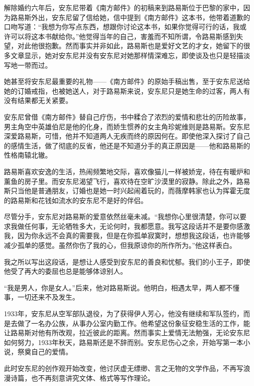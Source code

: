 解除婚约六年后，安东尼带着《南方邮件》的初稿来到路易斯位于巴黎的家中，因为路易斯外出，安东尼留了信给她，信中提到《南方邮件》这本书，他带着道歉的口吻写道：“我想为你写点东西，想跟你讨论这本书，如果你觉得可行的话，我或许可以将这本书献给你。”他觉得当年的自己，害羞而不知所谓，令路易斯感到失望，对此他很抱歉。然而事实并非如此，路易斯也是爱好文艺的才女，她留下的很多文章显示，她对安东尼并没有安东尼对她那样情深难忘，即使谈及也只是轻描淡写地一带而过。

她甚至将安东尼最重要的礼物------《南方邮件》的原始手稿出售，至于安东尼送给她的订婚戒指，也被她送人，对于路易斯来说，安东尼只是她生命的过客，两人有没有结果都无关紧要。

安东尼曾借《南方邮件》替自己疗伤，书中糅合了浓烈的爱情和悲壮的历险故事，男主角空中英雄伯尼是他的化身，而娇生惯养的女主角珍妮维则是路易斯。安东尼深爱路易斯，可惜，他并不知道两人无疾而终的原因何在。即使他深入探讨了自己的感情生活，做了彻底的反省，他还是不知道分手的真正原因是------他和路易斯的性格南辕北辙。

路易斯喜欢安逸的生活，热闹频繁地交际，喜欢像猫儿一样被娇宠，待在有暖炉和薰鱼的房子里。而安东尼渴望飞行，喜欢待在空旷沙漠里的寂静。除此之外，路易斯只当他是普通朋友，订婚也是她一时兴起闹着玩的，而薇摩韩家也认为挥霍无度的路易斯和花钱如流水的安东尼不是好的伴侣。

尽管分手，安东尼对路易斯的爱意依然丝毫未减。“我想你心里很清楚，你可以要求我做任何事，无论牺牲多大，无论何时，我都愿意。我写这段话并不是要你感激我，因为你永远不会真的需要我，但是在你孤单寂寞时，想想我这段话，也许能够减少孤单的感觉。虽然你伤了我的心，但我原谅你的所作所为。”他这样表白。

我之所以写出这段话，是想让人感受到安东尼的善良和忧郁。我们的小王子，即使他受了再大的委屈也总是能够体谅别人。

“我是男人，你是女人。”后来，他对路易斯说。他明白，相遇太早，两人都不懂事，一切还来不及发生。


\stoptitle

\starttitle[title={8}]

1933年，安东尼从空军部队退役，为了获得伊人芳心，他没有继续和军队签约，而是去做了一名办公族，从事办公室内勤工作。他希望这份象征安稳生活的工作，能让路易斯对他有所改观，拉近彼此的距离。然而事实上爱情无法勉强，无论安东尼如何努力，1933年秋天，路易斯还是不辞而别。安东尼伤心之余，开始写第一本小说，祭奠自己的爱情。

此时安东尼的创作观开始改变，他讨厌虚无缥缈、言之无物的文学作品，不再写浪漫诗篇，也不再刻意讲究文体、格式等写作理论。

